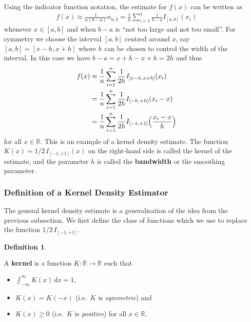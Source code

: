 \documentclass[
  a4paper,
]{article}
\providecommand{\tightlist}{%
  \setlength{\itemsep}{0pt}\setlength{\parskip}{0pt}}
\theoremstyle{definition}
\newtheorem{definition}{Definition}[section]
\theoremstyle{definition}
\theoremstyle{definition}
\theoremstyle{definition}
\theoremstyle{remark}
\begin{document}
Using the indicator function notation, the estimate for \(f(x)\)
can be written as
\begin{align*}
  f(x)
  \approx \frac{1}{n(b-a)} n_{a,b}
  = \frac{1}{n} \sum_{i=1}^n \frac{1}{b-a} I_{[a,b]}(x_i)
\end{align*}
whenever \(x \in [a,b]\) and when \(b-a\) is ``not too large and not too small''.
For symmetry we choose the interval \([a, b]\) centred around \(x\),
say \([a, b] = [x - h, x + h]\) where \(h\) can be chosen to control the
width of the interval. In this case we have \(b - a = x + h - x + h
= 2h\) and thus
\begin{align*}
  f(x)
  &\approx \frac{1}{n} \sum_{i=1}^n \frac{1}{2h} I_{[x-h,x+h]}(x_i) \\
  &= \frac{1}{n} \sum_{i=1}^n \frac{1}{2h} I_{[-h,+h]}(x_i-x) \\
  &= \frac{1}{n} \sum_{i=1}^n \frac{1}{2h} I_{[-1,+1]}\Bigl(\frac{x_i-x}{h}\Bigr)
\end{align*}
for all \(x \in \mathbb{R}\). This is an example of a kernel density estimate.
The function \(K(x) = 1/2 \, I_{[-1,+1]}(x)\) on the right-hand side is
called the kernel of the estimate, and the parameter \(h\) is called the
\textbf{bandwidth} or the smoothing parameter.

\subsubsection{Definition of a Kernel Density Estimator}\label{definition-of-a-kernel-density-estimator}

The general kernel density estimate is a generalisation of the idea
from the previous subsection. We first define the class of functions
which we use to replace the function \(1/2 \, I_{[-1,+1]}\).

\begin{definition}
\protect\hypertarget{def:kernel}{}\label{def:kernel}

A \textbf{kernel} is a function \(K\colon \mathbb{R}\to \mathbb{R}\) such that

\begin{itemize}
\tightlist
\item
  \(\int_{-\infty}^\infty K(x) \,dx = 1\),
\item
  \(K(x) = K(-x)\) (i.e.~\(K\) is \emph{symmetric}) and
\item
  \(K(x) \geq 0\) (i.e.~\(K\) is \emph{positive}) for all \(x\in \mathbb{R}\).
\end{itemize}

\end{definition}
\end{document}
